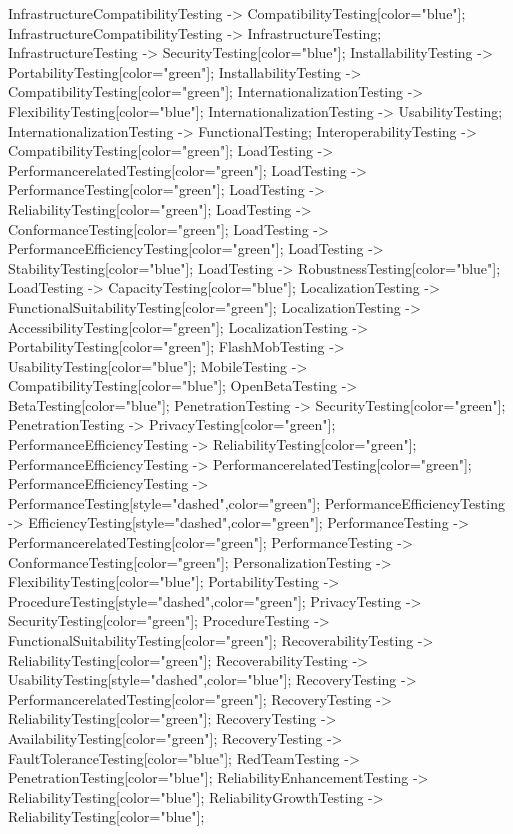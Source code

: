 \documentclass{article}
\begin{document}
{InfrastructureCompatibilityTesting -> CompatibilityTesting[color="blue"];
InfrastructureCompatibilityTesting -> InfrastructureTesting;
InfrastructureTesting -> SecurityTesting[color="blue"];
InstallabilityTesting -> PortabilityTesting[color="green"];
InstallabilityTesting -> CompatibilityTesting[color="green"];
InternationalizationTesting -> FlexibilityTesting[color="blue"];
InternationalizationTesting -> UsabilityTesting;
InternationalizationTesting -> FunctionalTesting;
InteroperabilityTesting -> CompatibilityTesting[color="green"];
LoadTesting -> PerformancerelatedTesting[color="green"];
LoadTesting -> PerformanceTesting[color="green"];
LoadTesting -> ReliabilityTesting[color="green"];
LoadTesting -> ConformanceTesting[color="green"];
LoadTesting -> PerformanceEfficiencyTesting[color="green"];
LoadTesting -> StabilityTesting[color="blue"];
LoadTesting -> RobustnessTesting[color="blue"];
LoadTesting -> CapacityTesting[color="blue"];
LocalizationTesting -> FunctionalSuitabilityTesting[color="green"];
LocalizationTesting -> AccessibilityTesting[color="green"];
LocalizationTesting -> PortabilityTesting[color="green"];
FlashMobTesting -> UsabilityTesting[color="blue"];
MobileTesting -> CompatibilityTesting[color="blue"];
OpenBetaTesting -> BetaTesting[color="blue"];
PenetrationTesting -> SecurityTesting[color="green"];
PenetrationTesting -> PrivacyTesting[color="green"];
PerformanceEfficiencyTesting -> ReliabilityTesting[color="green"];
PerformanceEfficiencyTesting -> PerformancerelatedTesting[color="green"];
PerformanceEfficiencyTesting -> PerformanceTesting[style="dashed",color="green"];
PerformanceEfficiencyTesting -> EfficiencyTesting[style="dashed",color="green"];
PerformanceTesting -> PerformancerelatedTesting[color="green"];
PerformanceTesting -> ConformanceTesting[color="green"];
PersonalizationTesting -> FlexibilityTesting[color="blue"];
PortabilityTesting -> ProcedureTesting[style="dashed",color="green"];
PrivacyTesting -> SecurityTesting[color="green"];
ProcedureTesting -> FunctionalSuitabilityTesting[color="green"];
RecoverabilityTesting -> ReliabilityTesting[color="green"];
RecoverabilityTesting -> UsabilityTesting[style="dashed",color="blue"];
RecoveryTesting -> PerformancerelatedTesting[color="green"];
RecoveryTesting -> ReliabilityTesting[color="green"];
RecoveryTesting -> AvailabilityTesting[color="green"];
RecoveryTesting -> FaultToleranceTesting[color="blue"];
RedTeamTesting -> PenetrationTesting[color="blue"];
ReliabilityEnhancementTesting -> ReliabilityTesting[color="blue"];
ReliabilityGrowthTesting -> ReliabilityTesting[color="blue"];
}
\end{document}
